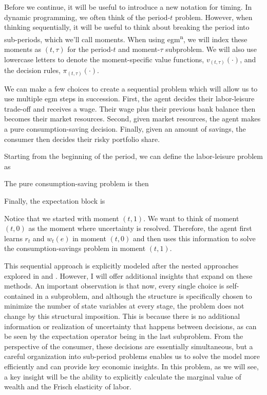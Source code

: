 \documentclass{article}
\begin{document}
Before we continue, it will be useful to introduce a new notation for timing. In dynamic programming, we often think of the period-$t$ problem. However, when thinking sequentially, it will be useful to think about breaking the period into sub-periods, which we'll call moments. When using \acrshort{egm}\textsuperscript{n}, we will index these moments as $(t, \tau)$ for the period-$t$ and moment-$\tau$ subproblem. We will also use lowercase letters to denote the moment-specific value functions, $v_{(t,\tau)}(\cdot)$, and the decision rules, $\pi_{(t,\tau)}(\cdot)$.

We can make a few choices to create a sequential problem which will allow us to use multiple \acrshort{egm} steps in succession. First, the agent decides their labor-leisure trade-off and receives a wage. Their wage plus their previous bank balance then becomes their market resources. Second, given market resources, the agent makes a pure consumption-saving decision. Finally, given an amount of savings, the consumer then decides their risky portfolio share.

Starting from the beginning of the period, we can define the labor-leisure problem as

The pure consumption-saving problem is then

Finally, the expectation block is

Notice that we started with moment $(t,1)$. We want to think of moment $(t,0)$ as the moment where uncertainty is resolved. Therefore, the agent first learns $r_t$ and $w_t(e)$ in moment $(t,0)$ and then uses this information to solve the consumption-savings problem in moment $(t,1)$.

This sequential approach is explicitly modeled after the nested approaches explored in \citet{Clausen2020} and \citet{Druedahl2021}. However, I will offer additional insights that expand on these methods. An important observation is that now, every single choice is self-contained in a subproblem, and although the structure is specifically chosen to minimize the number of state variables at every stage, the problem does not change by this structural imposition. This is because there is no additional information or realization of uncertainty that happens between decisions, as can be seen by the expectation operator being in the last subproblem. From the perspective of the consumer, these decisions are essentially simultaneous, but a careful organization into sub-period problems enables us to solve the model more efficiently and can provide key economic insights. In this problem, as we will see, a key insight will be the ability to explicitly calculate the marginal value of wealth and the Frisch elasticity of labor.
\end{document}
